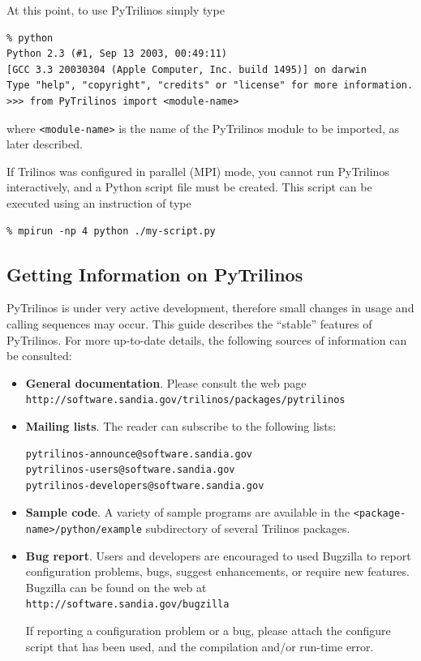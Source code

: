 \documentclass[10pt,relax]{SANDreport}
\newcommand{\PyTrilinos}{{PyTrilinos}}
\begin{document}
At this point, to use PyTrilinos  simply type
\begin{verbatim}
% python
Python 2.3 (#1, Sep 13 2003, 00:49:11) 
[GCC 3.3 20030304 (Apple Computer, Inc. build 1495)] on darwin
Type "help", "copyright", "credits" or "license" for more information.
>>> from PyTrilinos import <module-name>
\end{verbatim}
where \verb!<module-name>! is the name of the PyTrilinos module to be
imported, as later described.

If Trilinos was configured in parallel (MPI) mode, you cannot run PyTrilinos
interactively, and a Python script file must be created. This script can be
executed using an instruction of type
\begin{verbatim}
% mpirun -np 4 python ./my-script.py
\end{verbatim}

\subsection{Getting Information on \PyTrilinos}

PyTrilinos is under very active development, therefore small changes in usage
and calling sequences may occur. This
guide describes the ``stable'' features of PyTrilinos. For more up-to-date
details, the following sources of information can be consulted:
\begin{itemize}
\item {\bf General documentation}.
Please consult the web page \\
  \verb!http://software.sandia.gov/trilinos/packages/pytrilinos!
\item {\bf Mailing lists}. The reader can subscribe to the following lists:
\begin{verbatim}
pytrilinos-announce@software.sandia.gov
pytrilinos-users@software.sandia.gov
pytrilinos-developers@software.sandia.gov
\end{verbatim}
\item {\bf Sample code}. A variety of sample programs are available in the
\verb!<package-name>/python/example! subdirectory of several Trilinos
packages.
\item {\bf Bug report}.
Users and developers are encouraged to used Bugzilla to report
configuration problems, bugs, suggest enhancements, or require new features.
Bugzilla can be found on the web at\\
  \verb!http://software.sandia.gov/bugzilla!

If reporting a configuration problem or a bug, please attach the configure
script that has been used, and the compilation and/or run-time error.
\end{itemize}
\end{document}

